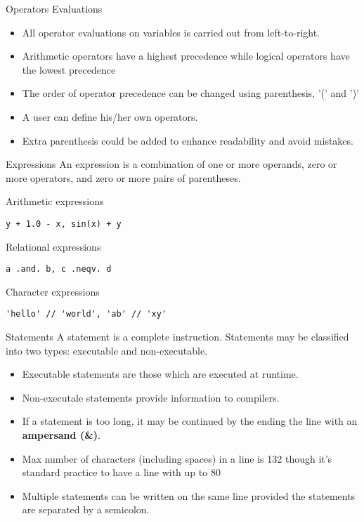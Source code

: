 \begin{frame}[fragile]{Operators Evaluations}
\begin{itemize}
 \item All operator evaluations on variables is carried out from left-to-right.
 \item Arithmetic operators have a highest precedence while logical operators have the lowest precedence
 \item The order of operator precedence can be changed using parenthesis, ’(’ and ’)’
 \item A user can define his/her own operators.
 \item Extra parenthesis could be added to enhance readability and avoid mistakes.
\end{itemize}
\end{frame}

\begin{frame}[fragile]{Expressions}
An expression is a combination of one or more operands, zero or
more operators, and zero or more pairs of parentheses.
\begin{block}{Arithmetic expressions}
\begin{lstlisting}
y + 1.0 - x, sin(x) + y
\end{lstlisting}
\end{block}
\begin{block}{Relational expressions}
\begin{lstlisting}
a .and. b, c .neqv. d
\end{lstlisting}
\end{block}
\begin{block}{Character expressions}
\begin{lstlisting}
'hello' // 'world', 'ab' // 'xy'
\end{lstlisting}
\end{block}
\end{frame}

\begin{frame}[fragile]{Statements}
A statement is a complete instruction. Statements may be classified into two types: 
executable and non-executable.
\begin{itemize}
 \item Executable statements are those which are executed at runtime.
 \item Non-executale statements provide information to compilers.
 \item If a statement is too long, it may be continued by the ending the
line with an \textbf{ampersand (\&)}.
 \item Max number of characters (including spaces) in a line is 132
though it’s standard practice to have a line with up to 80
 \item Multiple statements can be written on the same line provided the
statements are separated by a semicolon.
\end{itemize}
\end{frame}

